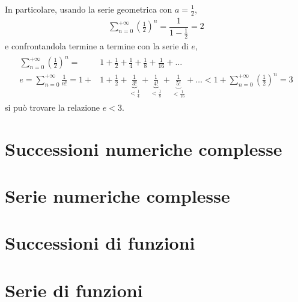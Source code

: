 \documentclass[letterpaper,10pt,english]{jupyterBook}
\begin{document}
\sphinxAtStartPar
In particolare, usando la serie geometrica con \(a = \frac{1}{2}\),
\begin{equation*}
\begin{split}\sum_{n=0}^{+\infty} \left(\frac{1}{2} \right)^n = \dfrac{1}{1 - \frac{1}{2}} = 2\end{split}
\end{equation*}
\sphinxAtStartPar
e confrontandola termine a termine con la serie di \(e\),
\begin{equation*}
\begin{split}\begin{aligned}
  \sum_{n=0}^{+\infty} \left(\frac{1}{2} \right)^n = & 1 + \frac{1}{2} + \frac{1}{4} + \frac{1}{8} + \frac{1}{16} + \dots \\
  e = \sum_{n=0}^{+\infty} \frac{1}{n!} = 1 + & 1 + \frac{1}{2} + \underbrace{\frac{1}{3!}}_{<\frac{1}{4}} + \underbrace{\frac{1}{4!}}_{< \frac{1}{8}} + \underbrace{\frac{1}{5!}}_{< \frac{1}{16}} + \dots <
    1 + \sum_{n=0}^{+\infty} \left( \frac{1}{2} \right)^n = 3
\end{aligned}\end{split}
\end{equation*}
\sphinxAtStartPar
si può trovare la relazione \(e < 3\).

\sphinxAtStartPar
{} 


\section{Successioni numeriche complesse}
\label{\detokenize{ch/series:successioni-numeriche-complesse}}

\section{Serie numeriche complesse}
\label{\detokenize{ch/series:serie-numeriche-complesse}}

\section{Successioni di funzioni}
\label{\detokenize{ch/series:successioni-di-funzioni}}

\section{Serie di funzioni}
\label{\detokenize{ch/series:serie-di-funzioni}}
\sphinxstepscope
\end{document}
